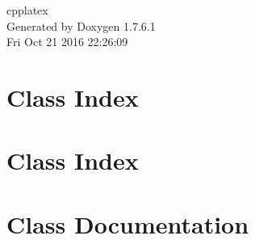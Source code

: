 \documentclass[a4paper]{book}
\begin{document}
\hypersetup{pageanchor=false,citecolor=blue}
\begin{titlepage}
\vspace*{7cm}
\begin{center}
{\Large cpplatex }\\
\vspace*{1cm}
{\large \-Generated by Doxygen 1.7.6.1}\\
\vspace*{0.5cm}
{\small Fri Oct 21 2016 22:26:09}\\
\end{center}
\end{titlepage}
\clearemptydoublepage
{}
\tableofcontents
\clearemptydoublepage
{}
\hypersetup{pageanchor=true,citecolor=blue}
\chapter{\-Class \-Index}

\chapter{\-Class \-Index}

\chapter{\-Class \-Documentation}




































\printindex
\end{document}

